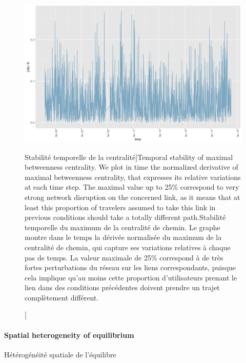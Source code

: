 \begin{figure}
\includegraphics[width=\linewidth]{Figures/Final/8-1-2-fig-transportationequilibrium-fig-4.jpg}
\caption[Temporal stability of maximal betweenness centrality][Stabilité temporelle de la centralité]{Temporal stability of maximal betweenness centrality. We plot in time the normalized derivative of maximal betweenness centrality, that expresses its relative variations at each time step. The maximal value up to 25\% correspond to very strong network disruption on the concerned link, as it means that at least this proportion of travelers assumed to take this link in previous conditions should take a totally different path.\label{fig:transportationequilibrium:fig-4}}{Stabilité temporelle du maximum de la centralité de chemin. Le graphe montre dans le temps la dérivée normalisée du maximum de la centralité de chemin, qui capture ses variations relatives à chaque pas de temps. La valeur maximale de 25\% correspond à de très fortes perturbations du réseau sur les liens correspondants, puisque cela implique qu'au moins cette proportion d'utilisateurs prenant le lien dans des conditions précédentes doivent prendre un trajet complètement différent.\label{fig:transportationequilibrium:fig-4}}
\end{figure}






\paragraph{Spatial heterogeneity of equilibrium}{Hétérogénéité spatiale de l'équilibre}



